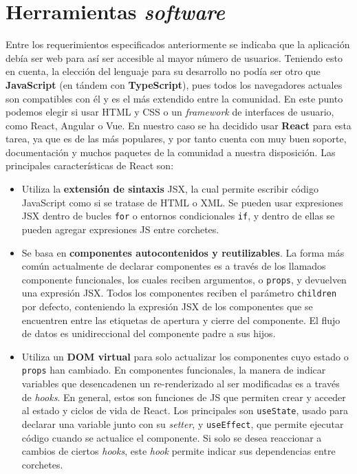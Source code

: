 \section{Herramientas \textit{software}}\label{sec:herramientas}
Entre los requerimientos especificados anteriormente se indicaba que la aplicación debía ser web para así ser accesible al mayor número de usuarios. Teniendo esto en cuenta, la elección del lenguaje para su desarrollo no podía ser otro que \textbf{JavaScript} (en tándem con \textbf{TypeScript}), pues todos los navegadores actuales son compatibles con él y es el más extendido entre la comunidad. En este punto podemos elegir si usar HTML y CSS o un \textit{framework} de interfaces de usuario, como React, Angular o Vue. En nuestro caso se ha decidido usar \textbf{React} \cite{react} para esta tarea, ya que es de las más populares, y por tanto cuenta con muy buen soporte, documentación y muchos paquetes de la comunidad a nuestra disposición. Las principales características de React son:
\begin{itemize}
    \item Utiliza la \textbf{extensión de sintaxis} JSX, la cual permite escribir código JavaScript como si se tratase de HTML o XML. Se pueden usar expresiones JSX dentro de bucles \texttt{for} o entornos condicionales \texttt{if}, y dentro de ellas se pueden agregar expresiones JS entre corchetes.
    \item Se basa en \textbf{componentes autocontenidos y reutilizables}. La forma más común actualmente de declarar componentes es a través de los llamados componente funcionales, los cuales reciben argumentos, o \texttt{props}, y devuelven una expresión JSX. Todos los componentes reciben el parámetro \texttt{children} por defecto, conteniendo la expresión JSX de los componentes que se encuentren entre las etiquetas de apertura y cierre del componente. El flujo de datos es unidireccional del componente padre a sus hijos.
    \item Utiliza un \textbf{DOM virtual} para solo actualizar los componentes cuyo estado o \texttt{props} han cambiado. En componentes funcionales, la manera de indicar variables que desencadenen un re-renderizado al ser modificadas es a través de \textit{hooks}. En general, estos son funciones de JS que permiten crear y acceder al estado y ciclos de vida de React. Los principales son \texttt{useState}, usado para declarar una variable junto con su \textit{setter}, y \texttt{useEffect}, que permite ejecutar código cuando se actualice el componente. Si solo se desea reaccionar a cambios de ciertos \textit{hooks}, este \textit{hook} permite indicar sus dependencias entre corchetes.
\end{itemize}

